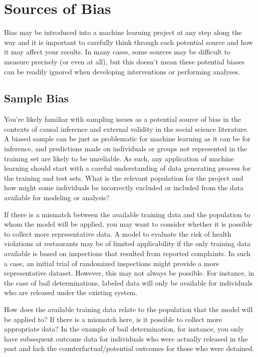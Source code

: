 \documentclass[]{krantz}
\begin{document}
\hypertarget{sec:biassources}{\section{Sources of
Bias}\label{sec:biassources}}

Bias may be introduced into a machine learning project at any step along
the way and it is important to carefully think through each potential
source and how it may affect your results. In many cases, some sources
may be difficult to measure precisely (or even at all), but this doesn't
mean these potential biases can be readily ignored when developing
interventions or performing analyses.

\subsection{Sample Bias}\label{sample-bias}

You're likely familiar with sampling issues as a potential source of
bias in the contexts of causal inference and external validity in the
social science literature. A biased sample can be just as problematic
for machine learning as it can be for inference, and predictions made on
individuals or groups not represented in the training set are likely to
be unreliable. As such, any application of machine learning should start
with a careful understanding of data generating process for the training
and test sets. What is the relevant population for the project and how
might some individuals be incorrectly excluded or included from the data
available for modeling or analysis?

If there is a mismatch between the available training data and the
population to whom the model will be applied, you may want to consider
whether it is possible to collect more representative data. A model to
evaluate the risk of health violations at restaurants may be of limited
applicability if the only training data available is based on
inspections that resulted from reported complaints. In such a case, an
initial trial of randomized inspections might provide a more
representative dataset. However, this may not always be possible. For
instance, in the case of bail determinations, labeled data will only be
available for individuals who are released under the existing system.

How does the available training data relate to the population that the
model will be applied to? If there is a mismatch here, is it possible to
collect more appropriate data? In the example of bail determination, for
instance, you only have subsequent outcome data for individuals who were
actually released in the past and lack the counterfactual/potential
outcomes for those who were detained.
\end{document}
